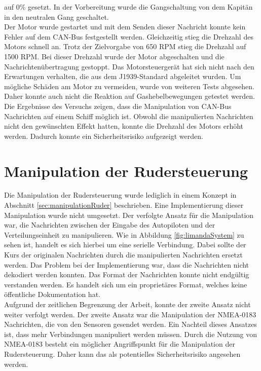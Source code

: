 auf 0\% gesetzt. In der Vorbereitung wurde die Gangschaltung von dem Kapitän in den neutralen
Gang geschaltet. \\
Der Motor wurde gestartet und mit dem
Senden dieser Nachricht konnte kein Fehler auf dem CAN-Bus festgestellt werden. Gleichzeitig stieg die Drehzahl des Motors
schnell an. Trotz der Zielvorgabe von 650 RPM stieg die Drehzahl auf 1500 RPM. Bei dieser Drehzahl wurde der
Motor abgeschalten und die Nachrichtenübertragung gestoppt. Das Motorsteuergerät hat sich nicht nach den Erwartungen verhalten,
die aus dem J1939-Standard abgeleitet wurden. Um mögliche Schäden am Motor zu vermeiden, wurde von weiteren Tests abgesehen.
Daher konnte auch nicht die Reaktion auf Gashebelbewegungen getestet werden. \\
Die Ergebnisse des Versuchs zeigen, dass die Manipulation von CAN-Bus Nachrichten auf einem Schiff möglich ist.
Obwohl die manipulierten Nachrichten nicht den gewünschten Effekt hatten, konnte die Drehzahl des Motors erhöht werden.
Dadurch konnte ein Sicherheitsrisiko aufgezeigt werden. 

\section{Manipulation der Rudersteuerung}
Die Manipulation der Rudersteuerung wurde lediglich in einem Konzept in Abschnitt \ref{sec:manipulationRuder} beschrieben.
Eine Implementierung dieser Manipulation wurde nicht umgesetzt. 
Der verfolgte Ansatz für die Manipulation war, die Nachrichten zwischen der Eingabe des Autopiloten und der 
Verteilungseinheit zu manipulieren. Wie in Abbildung \ref{fig:limandaSystem} zu sehen ist, handelt es sich hierbei um eine 
serielle Verbindung.
Dabei sollte der Kurs der originalen Nachrichten durch die manipulierten Nachrichten
ersetzt werden. Das Problem bei der Implementierung war, dass die Nachrichten nicht dekodiert werden konnten. 
Das Format der Nachrichten konnte nicht endgültig verstanden werden. Es handelt sich um ein proprietäres Format,
welches keine öffentliche Dokumentation hat. \\
Aufgrund der zeitlichen Begrenzung der Arbeit, konnte der zweite Ansatz nicht weiter verfolgt werden. 
Der zweite Ansatz war die Manipulation der NMEA-0183 Nachrichten, die von den Sensoren gesendet werden.
Ein Nachteil dieses Ansatzes ist, dass mehr Verbindungen manipuliert werden müssen.
Durch die Nutzung von NMEA-0183 besteht ein möglicher Angriffspunkt für die Manipulation der Rudersteuerung.
Daher kann das als potentielles Sicherheitsrisiko angesehen werden.